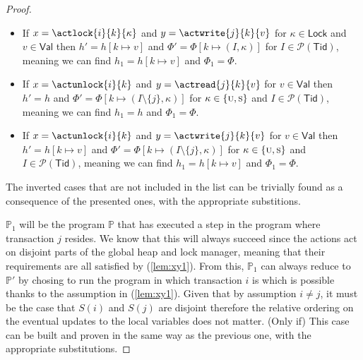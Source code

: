 \begin{proof}
\begin{itemize}
	\item If $x = \actlock{i}{k}{\kappa}$ and $y = \actwrite{j}{k}{v}$ for $\kappa \in \mathsf{Lock}$ and $v \in \mathsf{Val}$ then $h' = h[k \mapsto v]$ and $\Phi' = \Phi[k \mapsto (I, \kappa)]$ for $I \in \mathcal{P}(\mathsf{Tid})$, meaning we can find $h_1 = h[k \mapsto v]$ and $\Phi_1 = \Phi$.
	\item If $x = \actunlock{i}{k}$ and $y = \actread{j}{k}{v}$ for $v \in \mathsf{Val}$ then $h' = h$ and $\Phi' = \Phi[k \mapsto (I \setminus \{j\}, \kappa)]$ for $\kappa \in \{\textsc{u}, \textsc{s}\}$ and $I \in \mathcal{P}(\mathsf{Tid})$, meaning we can find $h_1 = h$ and $\Phi_1 = \Phi$.
	\item If $x = \actunlock{i}{k}$ and $y = \actwrite{j}{k}{v}$ for $v \in \mathsf{Val}$ then $h' = h[k \mapsto v]$ and $\Phi' = \Phi[k \mapsto (I \setminus \{j\}, \kappa)]$ for $\kappa \in \{\textsc{u}, \textsc{s}\}$ and $I \in \mathcal{P}(\mathsf{Tid})$, meaning we can find $h_1 = h[k \mapsto v]$ and $\Phi_1 = \Phi$.
\end{itemize}
The inverted cases that are not included in the list can be trivially found as a consequence of the presented ones, with the appropriate substitions.

$\mathds{P}_1$ will be the program $\mathds{P}$ that has executed a step in the program where transaction $j$ resides. We know that this will always succeed since the actions act on disjoint parts of the global heap and lock manager, meaning that their requirements are all satisfied by (\ref{lem:xy1}). From this, $\mathds{P}_1$ can always reduce to $\mathds{P}'$ by chosing to run the program in which transaction $i$ is which is possible thanks to the assumption in (\ref{lem:xy1}). Given that by assumption $i \neq j$, it must be the case that $S(i)$ and $S(j)$ are disjoint therefore the relative ordering on the eventual updates to the local variables does not matter. (Only if) This case can be built and proven in the same way as the previous one, with the appropriate substitutions.
\end{proof}

